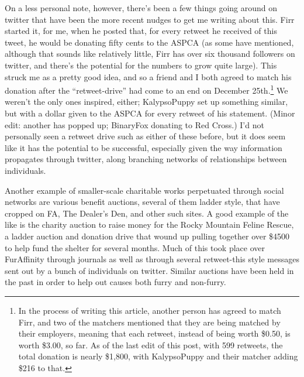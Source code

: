 On a less personal note, however, there's been a few things going around on twitter that have been the more recent nudges to get me writing about this.  Firr started it, for me, when he posted that, for every retweet he received of this tweet, he would be donating fifty cents to the ASPCA (as some have mentioned, although that sounds like relatively little, Firr has over six thousand followers on twitter, and there's the potential for the numbers to grow quite large). This struck me as a pretty good idea, and so a friend and I both agreed to match his donation after the ``retweet-drive'' had come to an end on December 25th.\footnote{In the process of writing this article, another person has agreed to match Firr, and two of the matchers mentioned that they are being matched by their employers, meaning that each retweet, instead of being worth \$0.50, is worth \$3.00, so far.  As of the last edit of this post, with 599 retweets, the total donation is nearly \$1,800, with KalypsoPuppy and their matcher adding \$216 to that.} We weren't the only ones inspired, either; KalypsoPuppy set up something similar, but with a dollar given to the ASPCA for every retweet of his statement.  (Minor edit: another has popped up; BinaryFox donating to Red Cross.)  I'd not personally seen a retweet drive such as either of these before, but it does seem like it has the potential to be successful, especially given the way information propagates through twitter, along branching networks of relationships between individuals.

Another example of smaller-scale charitable works perpetuated through social networks are various benefit auctions, several of them ladder style, that have cropped on FA, The Dealer's Den, and other such sites.  A good example of the like is the charity auction to raise money for the Rocky Mountain Feline Rescue, a ladder auction and donation drive that wound up pulling together over \$4500 to help fund the shelter for several months.  Much of this took place over FurAffinity through journals as well as through several retweet-this style messages sent out by a bunch of individuals on twitter.  Similar auctions have been held in the past in order to help out causes both furry and non-furry.


